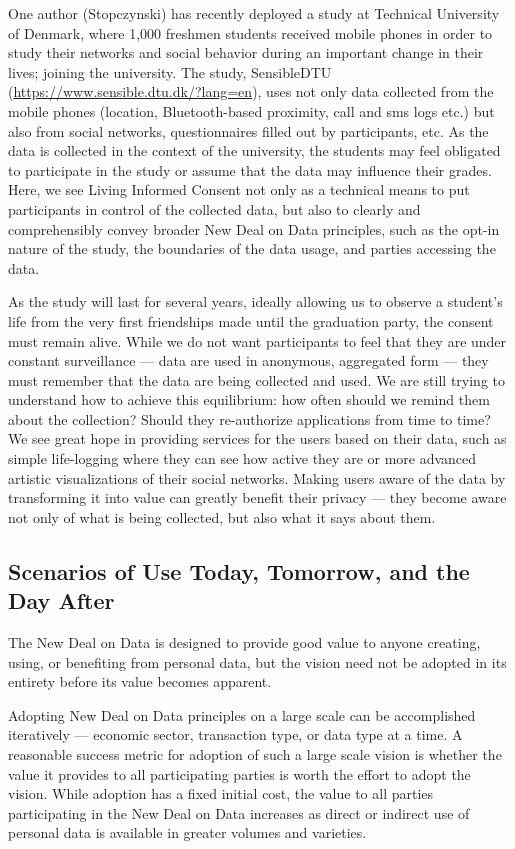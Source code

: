 One author (Stopczynski) has recently deployed a study at Technical University of Denmark, where 1,000 freshmen students received mobile phones in order to study their networks and social behavior during an important change in their lives; joining the university.
The study, SensibleDTU (\url{https://www.sensible.dtu.dk/?lang=en}), uses not only data collected from the mobile phones (location, Bluetooth-based proximity, call and sms logs etc.) but also from social networks, questionnaires filled out by participants, etc.
As the data is collected in the context of the university, the students may feel obligated to participate in the study or assume that the data may influence their grades.
Here, we see Living Informed Consent not only as a technical means to put participants in control of the collected data, but also to clearly and comprehensibly convey broader New Deal on Data principles, such as the opt-in nature of the study, the boundaries of the data usage, and parties accessing the data.

As the study will last for several years, ideally allowing us to observe a student's life from the very first friendships made until the graduation party, the consent must remain alive.
While we do not want participants to feel that they are under constant surveillance --- data are used in anonymous, aggregated form --- they must remember that the data are being collected and used.
We are still trying to understand how to achieve this equilibrium: how often should we remind them about the collection?
Should they re-authorize applications from time to time?
We see great hope in providing services for the users based on their data, such as simple life-logging where they can see how active they are or more advanced artistic visualizations of their social networks.
Making users aware of the data by transforming it into value can greatly benefit their privacy --- they become aware not only of what is being collected, but also what it says about them.

 \subsection{Scenarios of Use Today, Tomorrow, and the Day After}

The New Deal on Data is designed to provide good value to anyone creating, using, or benefiting from personal data, but the vision need not be adopted in its entirety before its value becomes apparent.

Adopting New Deal on Data principles on a large scale can be accomplished iteratively --- economic sector, transaction type, or data type at a time.
A reasonable success metric for adoption of such a large scale vision is whether the value it provides to all participating parties is worth the effort to adopt the vision.
While adoption has a fixed initial cost, the value to all parties participating in the New Deal on Data increases as direct or indirect use of personal data is available in greater volumes and varieties.

